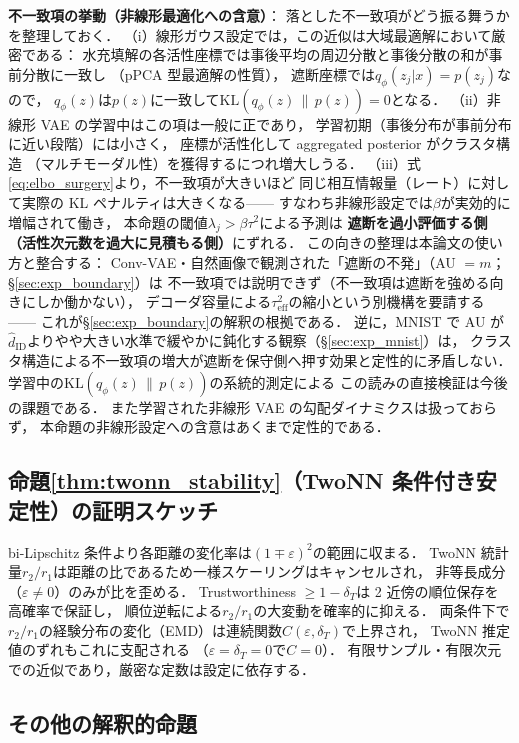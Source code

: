 \documentclass[11pt,a4paper]{jsarticle}
\newcommand{\hatdID}{\hat{d}_{\mathrm{ID}}}
\begin{document}
\textbf{不一致項の挙動（非線形最適化への含意）}：
落とした不一致項がどう振る舞うかを整理しておく．
（i）線形ガウス設定では，この近似は大域最適解において厳密である：
水充填解の各活性座標では事後平均の周辺分散と事後分散の和が事前分散に一致し
（pPCA 型最適解の性質\cite{tippingbishop1999ppca,lucas2019elbo}），
遮断座標では$q_\phi(z_j|x) = p(z_j)$なので，
$q_\phi(z)$は$p(z)$に一致して$\mathrm{KL}(q_\phi(z)\,\|\,p(z)) = 0$となる．
（ii）非線形 VAE の学習中はこの項は一般に正であり，
学習初期（事後分布が事前分布に近い段階）には小さく，
座標が活性化して aggregated posterior がクラスタ構造
（マルチモーダル性）を獲得するにつれ増大しうる．
（iii）式\eqref{eq:elbo_surgery}より，不一致項が大きいほど
同じ相互情報量（レート）に対して実際の KL ペナルティは大きくなる——
すなわち非線形設定では$\beta$が実効的に増幅されて働き，
本命題の閾値$\lambda_j > \beta\tau^2$による予測は
\textbf{遮断を過小評価する側（活性次元数を過大に見積もる側）}にずれる．
この向きの整理は本論文の使い方と整合する：
Conv-VAE・自然画像で観測された「遮断の不発」（AU $= m$；§\ref{sec:exp_boundary}）は
不一致項では説明できず（不一致項は遮断を強める向きにしか働かない），
デコーダ容量による$\tau^2_{\mathrm{eff}}$の縮小という別機構を要請する——
これが§\ref{sec:exp_boundary}の解釈の根拠である．
逆に，MNIST で AU が$\hatdID$よりやや大きい水準で緩やかに鈍化する観察（§\ref{sec:exp_mnist}）は，
クラスタ構造による不一致項の増大が遮断を保守側へ押す効果と定性的に矛盾しない．
学習中の$\mathrm{KL}(q_\phi(z)\,\|\,p(z))$の系統的測定による
この読みの直接検証は今後の課題である．
また学習された非線形 VAE の勾配ダイナミクスは扱っておらず，
本命題の非線形設定への含意はあくまで定性的である．

\subsection{命題\ref{thm:twonn_stability}（TwoNN 条件付き安定性）の証明スケッチ}

bi-Lipschitz 条件より各距離の変化率は$(1 \mp \varepsilon)^2$の範囲に収まる．
TwoNN 統計量$r_2/r_1$は距離の比であるため一様スケーリングはキャンセルされ，
非等長成分（$\varepsilon \neq 0$）のみが比を歪める．
Trustworthiness $\geq 1 - \delta_T$は 2 近傍の順位保存を高確率で保証し，
順位逆転による$r_2/r_1$の大変動を確率的に抑える．
両条件下で$r_2/r_1$の経験分布の変化（EMD）は連続関数$C(\varepsilon, \delta_T)$で上界され，
TwoNN 推定値のずれもこれに支配される
（$\varepsilon = \delta_T = 0$で$C = 0$）．
有限サンプル・有限次元での近似であり，厳密な定数は設定に依存する．

\subsection{その他の解釈的命題}
\end{document}
